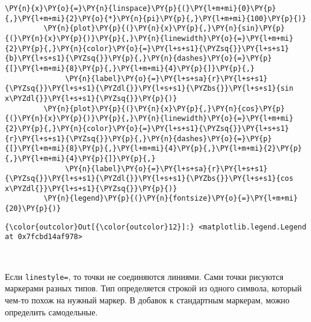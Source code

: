 \begin{Verbatim}[commandchars=\\\{\}]
         \PY{n}{x}\PY{o}{=}\PY{n}{linspace}\PY{p}{(}\PY{l+m+mi}{0}\PY{p}{,}\PY{l+m+mi}{2}\PY{o}{*}\PY{n}{pi}\PY{p}{,}\PY{l+m+mi}{100}\PY{p}{)}
         \PY{n}{plot}\PY{p}{(}\PY{n}{x}\PY{p}{,}\PY{n}{sin}\PY{p}{(}\PY{n}{x}\PY{p}{)}\PY{p}{,}\PY{n}{linewidth}\PY{o}{=}\PY{l+m+mi}{2}\PY{p}{,}\PY{n}{color}\PY{o}{=}\PY{l+s+s1}{\PYZsq{}}\PY{l+s+s1}{b}\PY{l+s+s1}{\PYZsq{}}\PY{p}{,}\PY{n}{dashes}\PY{o}{=}\PY{p}{[}\PY{l+m+mi}{8}\PY{p}{,}\PY{l+m+mi}{4}\PY{p}{]}\PY{p}{,}
              \PY{n}{label}\PY{o}{=}\PY{l+s+sa}{r}\PY{l+s+s1}{\PYZsq{}}\PY{l+s+s1}{\PYZdl{}}\PY{l+s+s1}{\PYZbs{}}\PY{l+s+s1}{sin x\PYZdl{}}\PY{l+s+s1}{\PYZsq{}}\PY{p}{)}
         \PY{n}{plot}\PY{p}{(}\PY{n}{x}\PY{p}{,}\PY{n}{cos}\PY{p}{(}\PY{n}{x}\PY{p}{)}\PY{p}{,}\PY{n}{linewidth}\PY{o}{=}\PY{l+m+mi}{2}\PY{p}{,}\PY{n}{color}\PY{o}{=}\PY{l+s+s1}{\PYZsq{}}\PY{l+s+s1}{r}\PY{l+s+s1}{\PYZsq{}}\PY{p}{,}\PY{n}{dashes}\PY{o}{=}\PY{p}{[}\PY{l+m+mi}{8}\PY{p}{,}\PY{l+m+mi}{4}\PY{p}{,}\PY{l+m+mi}{2}\PY{p}{,}\PY{l+m+mi}{4}\PY{p}{]}\PY{p}{,}
              \PY{n}{label}\PY{o}{=}\PY{l+s+sa}{r}\PY{l+s+s1}{\PYZsq{}}\PY{l+s+s1}{\PYZdl{}}\PY{l+s+s1}{\PYZbs{}}\PY{l+s+s1}{cos x\PYZdl{}}\PY{l+s+s1}{\PYZsq{}}\PY{p}{)}
         \PY{n}{legend}\PY{p}{(}\PY{n}{fontsize}\PY{o}{=}\PY{l+m+mi}{20}\PY{p}{)}
\end{Verbatim}

            \begin{Verbatim}[commandchars=\\\{\}]
{\color{outcolor}Out[{\color{outcolor}12}]:} <matplotlib.legend.Legend at 0x7fcbd14af978>
\end{Verbatim}
        
    \begin{center}
    \end{center}
    { \hspace*{\fill} \\}
    
    Если \texttt{linestyle=\textquotesingle{}\textquotesingle{}}, то точки
не соединяются линиями. Сами точки рисуются маркерами разных типов. Тип
определяется строкой из одного символа, который чем-то похож на нужный
маркер. В добавок к стандартным маркерам, можно определить самодельные.

